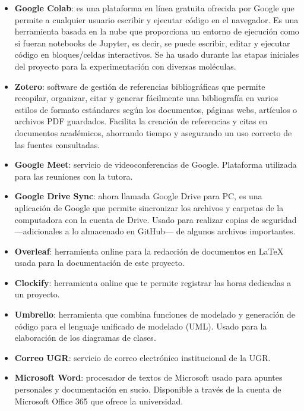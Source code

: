 \begin{itemize}
    \item \textbf{Google Colab}: es una plataforma en línea gratuita ofrecida por Google que permite a cualquier usuario escribir y ejecutar código en el navegador. Es una herramienta basada en la nube que proporciona un entorno de ejecución como si fueran notebooks de Jupyter, es decir, se puede escribir, editar y ejecutar código en bloques/celdas interactivos. Se ha usado durante las etapas iniciales del proyecto para la experimentación con diversas moléculas.
    
    \item \textbf{Zotero}: software de gestión de referencias bibliográficas que permite recopilar, organizar, citar y generar fácilmente una bibliografía en varios estilos de formato estándares según los documentos, páginas webs, artículos o archivos PDF guardados. Facilita la creación de referencias y citas en documentos académicos, ahorrando tiempo y asegurando un uso correcto de las fuentes consultadas.
    
    \item \textbf{Google Meet}: servicio de videoconferencias de Google. Plataforma utilizada para las reuniones con la tutora.

    \item \textbf{Google Drive Sync}: ahora llamada Google Drive para PC, es una aplicación de Google que permite sincronizar los archivos y carpetas de la computadora con la cuenta de Drive. Usado para realizar copias de seguridad —adicionales a lo almacenado en GitHub— de algunos archivos importantes. 

    \item \textbf{Overleaf}: herramienta online para la redacción de documentos en LaTeX usada para la documentación de este proyecto.

    \item \textbf{Clockify}: herramienta online que te permite registrar las horas dedicadas a un proyecto.

    \item \textbf{Umbrello}: herramienta que combina funciones de modelado y generación de código para el lenguaje unificado de modelado (UML). Usado para la elaboración de los diagramas de clases.

    \item \textbf{Correo UGR}: servicio de correo electrónico institucional de la UGR.

    \item \textbf{Microsoft Word}: procesador de textos de Microsoft usado para apuntes personales y documentación en sucio. Disponible a través de la cuenta de Microsoft Office 365 que ofrece la universidad.


\end{itemize}
